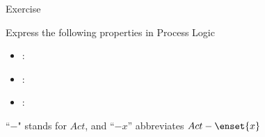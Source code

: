 \documentclass{beamer}
\begin{document}
% 
%

\begin{slide}{\red Exercise}\label{s:25}
\small
\begin{exampleblock}{Express the following properties in Process Logic}
\begin{itemize}
\item {}: 
\item {}: 
\item {}: 
 \end{itemize}
 \end{exampleblock}

``$-$" stands for $Act$, and ``$-x$'' abbreviates $Act-\enset{x}$


\end{slide}
\end{document}
